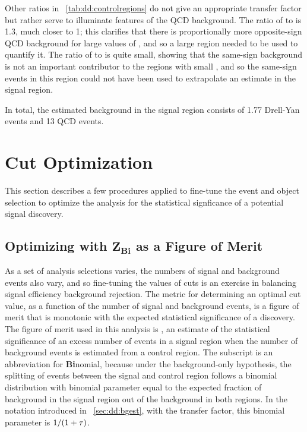 Other ratios in \Tab~\ref{tab:dd:controlregions} do not give an appropriate transfer factor but rather serve to illuminate features of the QCD background.
The ratio of  to  is 1.3, much closer to 1; this clarifies that there is proportionally more opposite-sign QCD background for large values of \LxySig, and so a large \LxySig region needed to be used to quantify it.
The ratio of  to  is quite small, showing that the same-sign background is not an important contributor to the regions with small \LxySig, and so the same-sign events in this region could not have been used to extrapolate an estimate in the signal region.

In total, the estimated background in the signal region consists of 1.77 Drell-Yan events and 13 QCD events.

\section{Cut Optimization}
This section describes a few procedures applied to fine-tune the event and object selection to optimize the analysis for the statistical signficance of a potential signal discovery.

\subsection[Optimizing with \ZBi as a Figure of Merit]{Optimizing with \texorpdfstring{$\bm{Z_{\mathbf{Bi}}}$}{ZBi} as a Figure of Merit}
\label{sec:dd:cutopt_ZBi}
As a set of analysis selections varies, the numbers of signal and background events also vary, and so fine-tuning the values of cuts is an exercise in balancing signal efficiency \vs background rejection.
The metric for determining an optimal cut value, as a function of the number of signal and background events, is a figure of merit that is monotonic with the expected statistical significance of a discovery.
The figure of merit used in this analysis is \ZBi \cite{Cousins:ZBi2008}, an estimate of the statistical significance of an excess number of events in a signal region when the number of background events is estimated from a control region.
The subscript is an abbreviation for \textbf{Bi}nomial, because under the background-only hypothesis, the splitting of events between the signal and control region follows a binomial distribution with binomial parameter equal to the expected fraction of background in the signal region out of the background in both regions.
In the notation introduced in \Sec~\ref{sec:dd:bgest}, with \TF the transfer factor, this binomial parameter is $1/(1+\tau)$.


